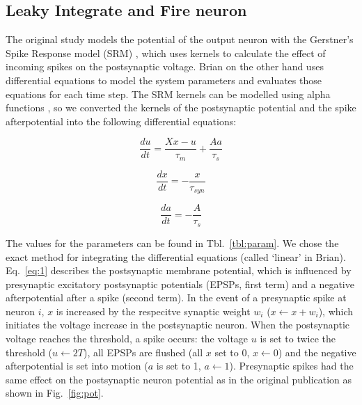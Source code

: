 \documentclass[10pt,a4paper,onecolumn]{article}
\begin{document}
\subsection{Leaky Integrate and Fire
neuron}\label{leaky-integrate-and-fire-neuron}

The original study models the potential of the output neuron with the
Gerstner's Spike Response model (SRM) \autocite{Gerstner2002}, which
uses kernels to calculate the effect of incoming spikes on the
postsynaptic voltage. Brian on the other hand uses differential
equations to model the system parameters and evaluates those equations
for each time step. The SRM kernels can be modelled using alpha
functions \autocite{Brette2007}, so we converted the kernels of the
postsynaptic potential and the spike afterpotential into the following
differential equations:

\begin{equation}\frac{du}{dt} = \frac{Xx - u}{\tau_{m}} + \frac{Aa}{\tau_{s}} \label{eq:u} \label{eq:1}\end{equation}

\begin{equation}\frac{dx}{dt} = -\frac{x}{\tau_{syn}}\label{eq:2}\end{equation}

\begin{equation}\frac{da}{dt} = -\frac{A}{\tau_{s}}\label{eq:3}\end{equation}

The values for the parameters can be found in Tbl.~\ref{tbl:param}. We
chose the exact method for integrating the differential equations
(called `linear' in Brian). Eq.~\ref{eq:1} describes the postsynaptic
membrane potential, which is influenced by presynaptic excitatory
postsynaptic potentials (EPSPs, first term) and a negative
afterpotential after a spike (second term). In the event of a
presynaptic spike at neuron \(i\), \(x\) is increased by the respecitve
synaptic weight \(w_{i}\) (\(x\leftarrow x+w_{i}\)), which initiates the
voltage increase in the postsynaptic neuron. When the postsynaptic
voltage reaches the threshold, a spike occurs: the voltage \(u\) is set
to twice the threshold (\(u\leftarrow 2T\)), all EPSPs are flushed (all
\(x\) set to 0, \(x\leftarrow 0\)) and the negative afterpotential is
set into motion (\(a\) is set to 1, \(a\leftarrow 1\)). Presynaptic
spikes had the same effect on the postsynaptic neuron potential as in
the original publication as shown in Fig.~\ref{fig:pot}.
\end{document}
